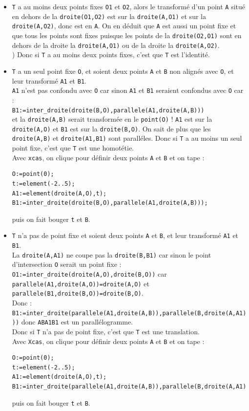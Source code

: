 \documentclass[a4paper,11pt]{book}
\begin{document}
\begin{itemize}
\item {\tt T} a au moins deux points fixes {\tt O1} et {\tt O2}, alors le 
transform\'e d'un point {\tt A} situ\'e en dehors de la {\tt droite(O1,O2)}
est sur la {\tt droite(A,O1)} et sur la {\tt droite(A,O2)}, donc est en 
{\tt A}. On en d\'eduit que {\tt A} est aussi un point fixe et que tous les 
points  sont fixes puisque les points de  la {\tt droite(O2,O1)} sont en 
dehors de la droite la {\tt droite(A,O1)} ou de la droite la 
{\tt droite(A,O2)}.\\)
Donc si {\tt T} a au moins deux points fixes, c'est que {\tt T} est 
l'identit\'e. 

\item {\tt T} a un seul point fixe {\tt O}, et soient deux points {\tt A} et 
{\tt B} non align\'es avec {\tt O}, et leur transform\'e {\tt A1} et 
{\tt B1}.\\ 
{\tt A1} n'est pas confondu avec {\tt O} car sinon {\tt A1} et {\tt B1}
seraient confondus avec {\tt O} car :\\
{\tt B1:=inter\_droite(droite(B,O),parallele(A1,droite(A,B)))}\\
et la {\tt droite(A,B)} serait transform\'ee en le {\tt point(O)} !
{\tt A1} est sur la 
{\tt droite(A,O)} et {\tt B1} est sur la {\tt droite(B,O)}. On sait de plus 
que  les {\tt droite(A,B)} et {\tt droite(A1,B1)} sont parall\'eles.
Donc si {\tt T} a au moins un seul point fixe, c'est que {\tt T} est une 
homot\'etie.\\
Avec {\tt xcas}, on clique pour d\'efinir deux points {\tt A} et {\tt B} et
on tape :
\begin{verbatim}
O:=point(0);
t:=element(-2..5);
A1:=element(droite(A,O),t);
B1:=inter_droite(droite(B,O),parallele(A1,droite(A,B)));
\end{verbatim}
puis on fait bouger {\tt t} et {\tt B}.

\item {\tt T} n'a pas de point fixe et soient deux points {\tt A} et 
{\tt B}, et leur transform\'e {\tt A1} et {\tt B1}.\\

La {\tt droite(A,A1)} ne coupe pas la {\tt droite(B,B1)} car sinon le point 
d'intersection {\tt O} serait un point fixe :
{\tt O1:=inter\_droite(droite(A,O),droite(B,O))}
car {\tt parallele(A1,droite(A,O))=droite(A,O)} et\\
{\tt parallele(B1,droite(B,O))=droite(B,O)}.\\
Donc :\\
{\tt B1:=inter\_droite(parallele(A1,droite(A,B)),parallele(B,droite(A,A1)))}
donc {\tt ABA1B1} est un parall\'elogramme.\\
Donc si {\tt T} n'a pas de point fixe, c'est que {\tt T} est une translation.\\
Avec {\tt Xcas}, on clique pour d\'efinir deux points {\tt A} et {\tt B} et
on tape :
\begin{verbatim}
O:=point(0);
t:=element(-2..5);
A1:=element(droite(A,O),t);
B1:=inter_droite(parallele(A1,droite(A,B)),parallele(B,droite(A,A1)));
\end{verbatim}
puis on fait bouger {\tt t} et {\tt B}.\end{itemize}
\end{document}
